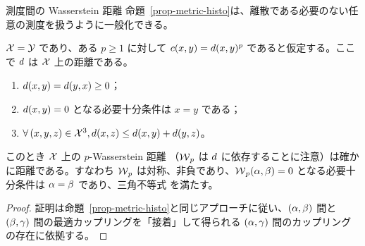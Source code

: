\begin{rem1}{測度間の Wasserstein 距離}
命題~\ref{prop-metric-histo}は、離散である必要のない任意の測度を扱うように一般化できる。

\begin{prop}\label{prop-metric-measure}
$\mathcal{X}=\mathcal{Y}$ であり、ある $p \geq 1$ に対して $c(x,y)=d(x,y)^p$ であると仮定する。ここで $d$ は $\mathcal{X}$ 上の距離である。\ie
\begin{enumerate}[label=(\roman*)]
	\item  $d(x,y) = d(y,x) \geq 0$；
	\item  $d(x,y)=0$ となる必要十分条件は $x=y$ である；
	\item  $\forall \, (x,y,z) \in \mathcal{X}^3, d(x,z) \leq d(x,y)+d(y,z)$。
\end{enumerate}
このとき $\mathcal{X}$ 上の $p$-Wasserstein 距離
（$\operatorname{\mathcal{W}}_p$ は $d$ に依存することに注意）は確かに距離である。すなわち $\operatorname{\mathcal{W}}_p$ は対称、非負であり、$\operatorname{\mathcal{W}}_p(\alpha,\beta)=0$ となる必要十分条件は $\alpha = \beta$ であり、三角不等式
を満たす。
\end{prop}
\begin{proof}
証明は命題~\ref{prop-metric-histo}と同じアプローチに従い、$(\alpha,\beta)$ 間と $(\beta,\gamma)$ 間の最適カップリングを「接着」して得られる $(\alpha,\gamma)$ 間のカップリングの存在に依拠する。
\end{proof}
\end{rem1}


